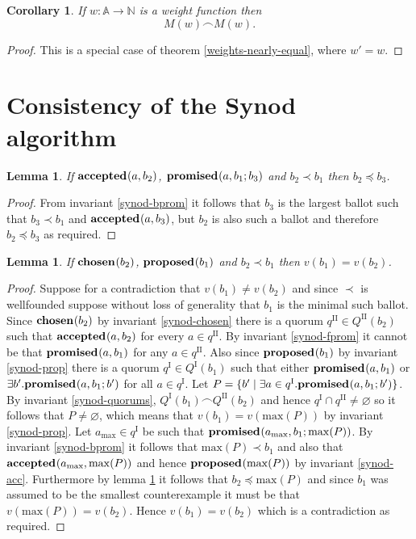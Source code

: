 \documentclass[journal]{IEEEtran}
\newtheorem{lemma}[theorem]{Lemma}
\newtheorem{corollary}[theorem]{Corollary}
\begin{document}
\begin{corollary} \label{weights-equal} If $w : \mathbb A \to \mathbb N$ is a
weight function then \[M(w) \frown M(w).\]  \end{corollary}

\begin{proof} This is a special case of theorem \ref{weights-nearly-equal},
where $w' = w$.  \end{proof}


\section{Consistency of the Synod algorithm}
\label{synod-safety}

\begin{lemma}\label{synod-acc-bprom}If $\mathbf{accepted}_{}(a,b_2)$,
$\mathbf{promised}_{}(a,b_1;b_3)$ and $b_2 \prec b_1$ then $b_2 \preceq b_3$.\end{lemma}

\begin{proof} From invariant \ref{synod-bprom} it follows that $b_3$ is the
largest ballot such that $b_3 \prec b_1$ and $\mathbf{accepted}_{}(a,b_3)$, but $b_2$ is
also such a ballot and therefore $b_2 \preceq b_3$ as required.  \end{proof}

\begin{lemma}\label{synod-lemma} If $\mathbf{chosen}_{}(b_2)$, $\mathbf{proposed}_{}(b_1)$ and $b_2
\prec b_1$ then $v(b_1) = v(b_2)$. \end{lemma}

\begin{proof}Suppose for a contradiction that $v(b_1) \ne v(b_2)$ and since
$\prec$ is wellfounded suppose without loss of generality that $b_1$ is the
minimal such ballot.  Since $\mathbf{chosen}_{}(b_2)$ by invariant \ref{synod-chosen}
there is a quorum $q^\textrm{II} \in Q^\textrm{II}(b_2)$ such that
$\mathbf{accepted}_{}(a,b_2)$ for every $a \in q^\textrm{II}$.  By invariant
\ref{synod-fprom} it cannot be that $\mathbf{promised}_{}(a,b_1)$ for any $a \in
q^\textrm{II}$.  Also since $\mathbf{proposed}_{}(b_1)$ by invariant \ref{synod-prop} there
is a quorum $q^\textrm{I} \in Q^\textrm{I}(b_1)$ such that either
$\mathbf{promised}_{}(a,b_1)$ or $\exists b'.  \mathbf{promised}_{}(a,b_1;b')$ for all $a \in
q^\textrm{I}$.  Let $P = \{ b' \mid \exists a \in q^\textrm{I}.
\mathbf{promised}_{}(a,b_1;b') \}$.  By invariant \ref{synod-quorums},
${Q^\textrm{I}(b_1) \frown Q^\textrm{II}(b_2)}$ and hence $q^\textrm{I} \cap
q^\textrm{II} \ne \varnothing$ so it follows that $P \ne \varnothing$, which
means that $v(b_1) = v(\mathrm{max}(P))$ by invariant \ref{synod-prop}. Let
$a_{\mathrm{max}} \in q^\textrm{I}$ be such that
$\mathbf{promised}_{}(a_{\mathrm{max}},b_1;\mathrm{max}(P))$.  By invariant
\ref{synod-bprom} it follows that $\mathrm{max}(P) \prec b_1$ and also that
$\mathbf{accepted}_{}(a_{\mathrm{max}},\mathrm{max}(P))$ and hence
$\mathbf{proposed}_{}(\mathrm{max}(P))$ by invariant \ref{synod-acc}. Furthermore by lemma
\ref{synod-acc-bprom} it follows that $b_2 \preceq \mathrm{max}(P)$ and since
$b_1$ was assumed to be the smallest counterexample it must be that
$v(\mathrm{max}(P)) = v(b_2)$.  Hence $v(b_1) = v(b_2)$ which is a
contradiction as required.  \end{proof}
\end{document}
